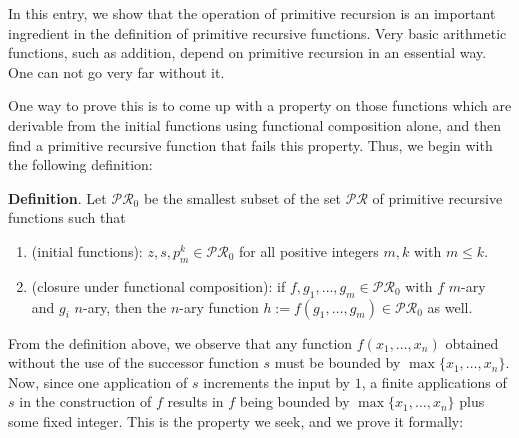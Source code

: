\documentclass[12pt]{article}
\begin{document}
In this entry, we show that the operation of primitive recursion is an important ingredient in the definition of primitive recursive functions.  Very basic arithmetic functions, such as addition, depend on primitive recursion in an essential way.  One can not go very far without it.

One way to prove this is to come up with a property on those functions which are derivable from the initial functions using functional composition alone, and then find a primitive recursive function that fails this property.  Thus, we begin with the following definition:

\textbf{Definition}.  Let $\mathcal{PR}_0$ be the smallest subset of the set $\mathcal{PR}$ of primitive recursive functions such that
\begin{enumerate}
\item (initial functions): $z,s,p_m^k \in \mathcal{PR}_0$ for all positive integers $m,k$ with $m\le k$.
\item (closure under functional composition): if $f, g_1,\ldots,g_m  \in \mathcal{PR}_0$ with $f$ $m$-ary and $g_i$ $n$-ary, then the $n$-ary function $h:=f(g_1,\ldots, g_m) \in \mathcal{PR}_0$ as well.
\end{enumerate}

From the definition above, we observe that any function $f(x_1,\ldots, x_n)$ obtained without the use of the successor function $s$ must be bounded by $\max\lbrace x_1,\ldots, x_n\rbrace$.  Now, since one application of $s$ increments the input by $1$, a finite applications of $s$ in the construction of $f$ results in $f$ being bounded by $\max \lbrace x_1,\ldots,x_n\rbrace$ plus some fixed integer.  This is the property we seek, and we prove it formally:
\end{document}

